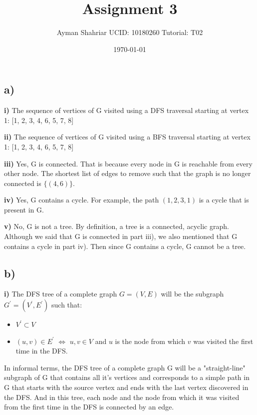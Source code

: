 \documentclass{article}
\title{Assignment 3}
\author{Ayman Shahriar \;\; UCID: 10180260 \;\;  Tutorial: T02 }
\date{\today}
\begin{document}
\maketitle

\raggedright
\setlength{\parskip}{0.8em}  %


\subsection*{a)}

\textbf{i)} The sequence of vertices of G visited using a DFS traversal starting at vertex 1: [1, 2, 3, 4, 6, 5, 7, 8]

\textbf{ii)} The sequence of vertices of G visited using a BFS traversal starting at vertex 1: [1, 2, 3, 4, 6, 5, 7, 8]

\textbf{iii)} Yes, G is connected. That is because every node in G is reachable from every other node. The shortest list of edges to remove such that the graph is no longer connected is $\{(4, 6)\}$.

\textbf{iv)} Yes, G contains a cycle. For example, the path $(1, 2, 3, 1)$ is a cycle that is present in G.

\textbf{v)} No, G is not a tree. By definition, a tree is a connected, acyclic graph. Although we said that G is connected in part iii), we also mentioned that G contains a cycle in part iv). Then since G contains a cycle, G cannot be a tree.


\subsection*{b)}

\textbf{i)} The DFS tree of a complete graph $G = (V, E)$ will be the subgraph $G^{\prime} = (V^{\prime}, E^{\prime})$ such that:
\begin{itemize}
    \item $V^{\prime} \subset V$
    \item $(u, v) \in E^{\prime}$ $\iff$ $u,v \in V$ and $u$ is the node from which $v$ was visited the first time in the DFS.
\end{itemize}

In informal terms, the DFS tree of a complete graph G will be a "straight-line" subgraph of G that contains all it's vertices and corresponds to a simple path in G that starts with the source vertex and ends with the last vertex discovered in the DFS. And in this tree, each node and the node from which it was visited from the first time in the DFS is connected by an edge.
\end{document}
